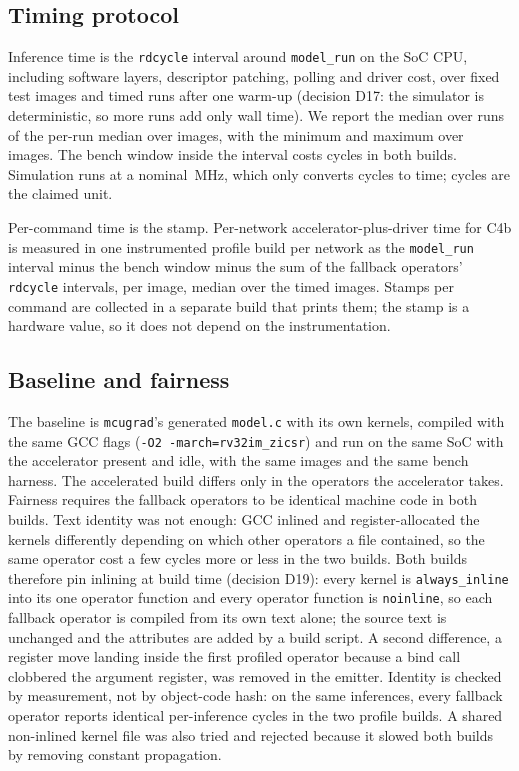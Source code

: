 \documentclass[journal]{IEEEtran}
\newcommand{\code}[1]{\texttt{#1}}
\begin{document}
\subsection{Timing protocol}
Inference time is the \code{rdcycle} interval around \texttt{model\_run} on the SoC CPU, including software layers, descriptor patching, polling and driver cost, over \BaselineImagesMnist{} fixed test images and \BaselineRunsMnist{} timed runs after one warm-up (decision D17: the simulator is deterministic, so more runs add only wall time). We report the median over runs of the per-run median over images, with the minimum and maximum over images. The bench window inside the interval costs \BenchWindow{} cycles in both builds. Simulation runs at a nominal \ClockMHzMnist{}\,MHz, which only converts cycles to time; cycles are the claimed unit.

Per-command time is the stamp. Per-network accelerator-plus-driver time for C4b is measured in one instrumented profile build per network as the \texttt{model\_run} interval minus the bench window minus the sum of the fallback operators' \code{rdcycle} intervals, per image, median over the timed images. Stamps per command are collected in a separate build that prints them; the stamp is a hardware value, so it does not depend on the instrumentation.

\subsection{Baseline and fairness}
The baseline is \texttt{mcugrad}'s generated \texttt{model.c} with its own kernels, compiled with the same GCC flags (\code{-O2 -march=rv32im\_zicsr}) and run on the same SoC with the accelerator present and idle, with the same images and the same bench harness. The accelerated build differs only in the operators the accelerator takes. Fairness requires the fallback operators to be identical machine code in both builds. Text identity was not enough: GCC inlined and register-allocated the kernels differently depending on which other operators a file contained, so the same operator cost a few cycles more or less in the two builds. Both builds therefore pin inlining at build time (decision D19): every kernel is \code{always\_inline} into its one operator function and every operator function is \code{noinline}, so each fallback operator is compiled from its own text alone; the source text is unchanged and the attributes are added by a build script. A second difference, a register move landing inside the first profiled operator because a bind call clobbered the argument register, was removed in the emitter. Identity is checked by measurement, not by object-code hash: on the same inferences, every fallback operator reports identical per-inference cycles in the two profile builds. A shared non-inlined kernel file was also tried and rejected because it slowed both builds by removing constant propagation.
\end{document}
